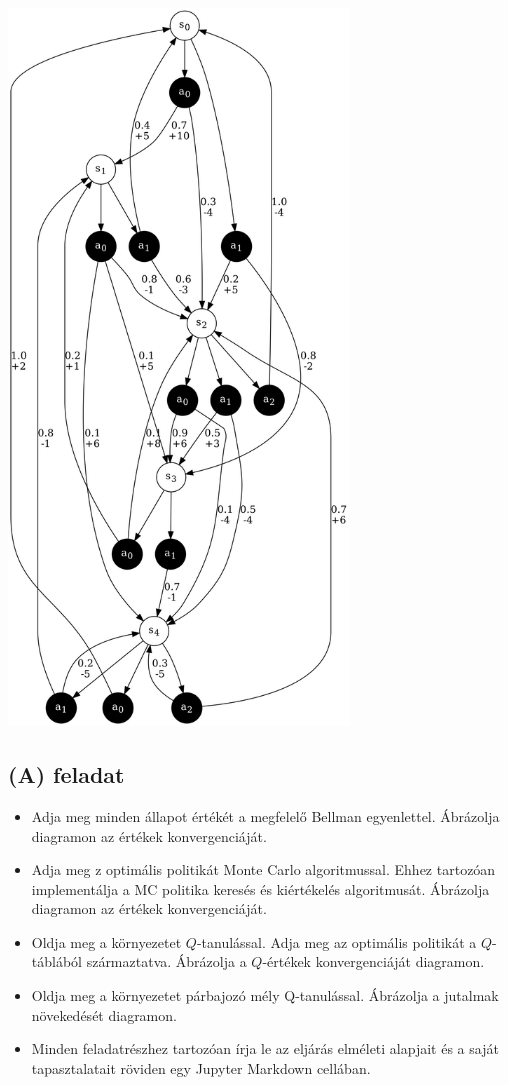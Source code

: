 \documentclass[english]{article}
\begin{document}
\begin{center}
\includegraphics[width=\textwidth, height=19cm, keepaspectratio]{graphs/1_mdp.png}
\end{center}

\newpage{}

\subsection{(\textbf{A}) feladat}
\begin{itemize}
	\item Adja meg minden állapot értékét a megfelelő Bellman egyenlettel. Ábrázolja diagramon az értékek konvergenciáját.
	\item Adja meg z optimális politikát Monte Carlo algoritmussal. Ehhez tartozóan implementálja a MC politika keresés és kiértékelés algoritmusát. Ábrázolja diagramon az értékek konvergenciáját.
	\item Oldja meg a környezetet $Q$-tanulással. Adja meg az optimális politikát a $Q$-táblából származtatva. Ábrázolja a $Q$-értékek konvergenciáját diagramon. 
	\item Oldja meg a környezetet párbajozó mély Q-tanulással. Ábrázolja a jutalmak növekedését diagramon. 
	\item Minden feladatrészhez tartozóan írja le az eljárás elméleti alapjait és a saját tapasztalatait röviden egy Jupyter Markdown cellában.
\end{itemize}
\end{document}
